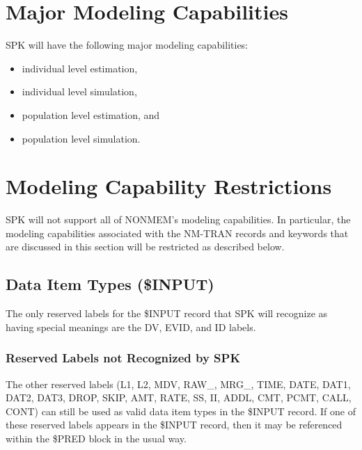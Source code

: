 \documentclass{article}
\begin{document}
%
\section{Major Modeling Capabilities}
%

SPK will have the following major modeling capabilities:
\begin{itemize}
  \item individual level estimation,
  \item individual level simulation,
  \item population level estimation, and
  \item population level simulation.
\end{itemize}


%
\section{Modeling Capability Restrictions}
%

SPK will not support all of NONMEM's modeling capabilities.
In particular, the modeling capabilities associated with the 
NM-TRAN records and keywords that are discussed in this section 
will be restricted as described below.


\subsection{Data Item Types (\$INPUT)}

The only reserved labels for the \$INPUT record that SPK will
recognize as having special meanings are the DV, EVID, and
ID labels.


\subsubsection{Reserved Labels not Recognized by SPK}

The other reserved labels
(L1, L2, MDV, RAW\_, MRG\_, TIME, DATE, DAT1, DAT2, DAT3, 
DROP, SKIP, AMT, RATE, SS, II, ADDL, CMT, PCMT, CALL, CONT)
can still be used as valid 
data item types in the \$INPUT record.
If one of these reserved labels appears in the \$INPUT record, 
then it may  be referenced within the \$PRED block in the usual way.
\end{document}
